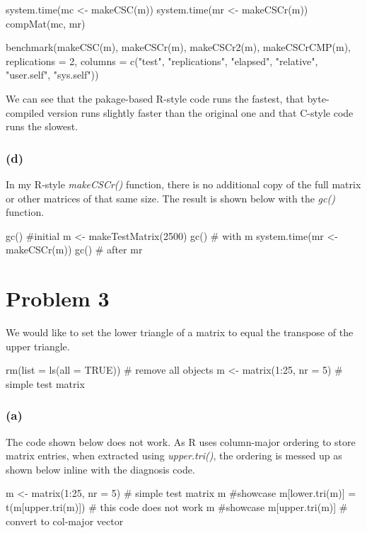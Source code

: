 \documentclass{article}
\begin{document}
system.time(mc <- makeCSC(m))
system.time(mr <- makeCSCr(m))
compMat(mc, mr)

benchmark(makeCSC(m), makeCSCr(m), makeCSCr2(m), makeCSCrCMP(m), replications = 2,
          columns = c("test", "replications", "elapsed", "relative", "user.self", "sys.self"))

We can see that the pakage-based R-style code runs the fastest, that byte-compiled version runs slightly
faster than the original one and that C-style code runs the slowest.

\subsubsection*{(d)}
In my R-style \textit{makeCSCr()} function, there is no additional copy of the full matrix or other matrices
of that same size. The result is shown below with the \textit{gc()} function.

gc() #initial
m <- makeTestMatrix(2500)
gc() # with m
system.time(mr <- makeCSCr(m))
gc() # after mr


\newpage
\section*{Problem 3}
We would like to set the lower triangle of a matrix to equal the transpose of the upper triangle.

rm(list = ls(all = TRUE)) # remove all objects
m <- matrix(1:25, nr = 5) # simple test matrix

\subsubsection*{(a)}
The code shown below does not work. As R uses column-major ordering to store matrix entries, when extracted
using \textit{upper.tri()}, the ordering is messed up as shown below inline with the diagnosis code.

m <- matrix(1:25, nr = 5) # simple test matrix
m #showcase
m[lower.tri(m)] = t(m[upper.tri(m)]) # this code does not work
m #showcase
m[upper.tri(m)] # convert to col-major vector     
\end{document}
